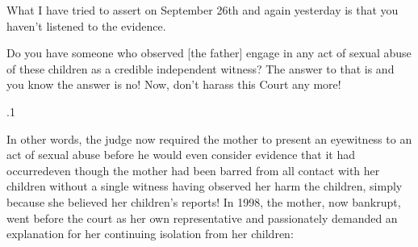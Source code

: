 \documentclass[11pt, twoside]{article}
\begin{document}
{{\begin{docDescription}


What I have tried to assert on
September 26th and again yesterday is that you haven’t
listened to the evidence.

Do you have someone who observed [the father]
engage in any act of sexual abuse of these children as
a credible independent witness? The answer to that is
 and you know the answer is no! Now, don’t harass
this Court any more!

\end{docDescription}

}%

\p.1{%
In other words, the judge now required the
mother to present an eyewitness to an act of sexual
abuse before he would even consider evidence
that it had occurred\mdash{}even though the mother had been barred from all
contact with her children without a single witness having observed her
harm the children, simply because she believed her children’s reports!
In 1998, the mother, now bankrupt, went before the court as her
own representative and passionately demanded an explanation for her
continuing isolation from her children:

}}
\end{document}
